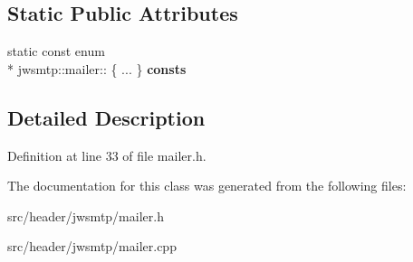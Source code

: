 \subsection*{Static Public Attributes}
\begin{DoxyCompactItemize}
\item 
\hypertarget{classjwsmtp_1_1mailer_abdf7408f0f12643fa0591ea90ebd151f}{static const enum \\*
jwsmtp\-::mailer\-:: \{ ... \}  {\bfseries consts}}\label{classjwsmtp_1_1mailer_abdf7408f0f12643fa0591ea90ebd151f}

\end{DoxyCompactItemize}


\subsection{Detailed Description}


Definition at line 33 of file mailer.\-h.



The documentation for this class was generated from the following files\-:\begin{DoxyCompactItemize}
\item 
src/header/jwsmtp/mailer.\-h\item 
src/header/jwsmtp/mailer.\-cpp\end{DoxyCompactItemize}
